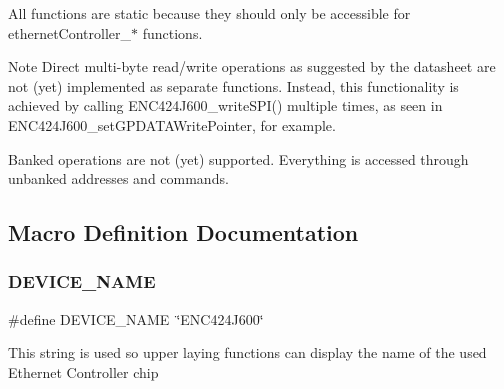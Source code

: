 All functions are static because they should only be accessible for ethernet\+Controller\+\_\+$\ast$ functions.

\begin{DoxyNote}{Note}
Direct multi-\/byte read/write operations as suggested by the datasheet are not (yet) implemented as separate functions. Instead, this functionality is achieved by calling E\+N\+C424\+J600\+\_\+write\+S\+P\+I() multiple times, as seen in E\+N\+C424\+J600\+\_\+set\+G\+P\+D\+A\+T\+A\+Write\+Pointer, for example.

Banked operations are not (yet) supported. Everything is accessed through unbanked addresses and commands. 
\end{DoxyNote}


\subsection{Macro Definition Documentation}
\mbox{\label{group__enc424j600__module_ga5f5a2c9450ebc584b4fe743c6b1a280b}} 
\subsubsection{\texorpdfstring{DEVICE\_NAME}{DEVICE\_NAME}}
{\footnotesize\ttfamily \#define D\+E\+V\+I\+C\+E\+\_\+\+N\+A\+ME~\char`\"{}E\+N\+C424\+J600\char`\"{}}

This string is used so upper laying functions can display the name of the used Ethernet Controller chip 